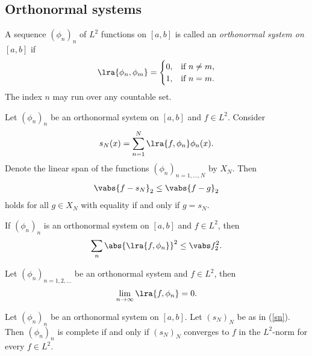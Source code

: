 \documentclass{article}
\begin{document}
\subsection{Orthonormal systems}

\begin{definition}[Notes 5.4]
    A sequence $(\phi_n)_n$ of $L^2$ functions on $[a,b]$ is called an \emph{orthonormal system on $[a,b]$}
    if
    \begin{align*}
        \lra{\phi_n, \phi_m} = \begin{cases}
            0, & \text{if }n\not=m, \\
            1, & \text{if }n=m.
        \end{cases}
    \end{align*}
    The index $n$ may run over any countable set.
\end{definition}

\begin{theorem}[Notes 5.2]
    Let $(\phi_n)_n$ be an orthonormal system on $[a,b]$ and $f\in L^2$. Consider
    \begin{align}
        \label{sn}
        s_N(x) = \sum_{n=1}^N \lra{f,\phi_n}\phi_n(x).
    \end{align}
    Denote the linear span of the functions $(\phi_n)_{n=1,...,N}$ by $X_N$. Then
    \begin{align*}
        \vabs{f-s_N}_2 \leq \vabs{f-g}_2
    \end{align*}
    holds for all $g\in X_N$ with equality if and only if $g=s_N$.
\end{theorem}

\begin{theorem}
    If $(\phi_n)_n$ is an orthonormal system on $[a,b]$ and $f\in L^2$, then
    \begin{align*}
        \sum_n \abs{\lra{f,\phi_n}}^2 \leq \vabs f_2^2.
    \end{align*}
\end{theorem}

\begin{corollary}
    Let $(\phi_n)_{n=1,2,...}$ be an orthonormal system and $f\in L^2$, then
    \begin{align*}
        \lim_{n\to\infty} \lra{f,\phi_n}=0.
    \end{align*}
\end{corollary}

\begin{theorem}[Notes 5.4]
    Let $(\phi_n)_n$ be an orthonormal system on $[a,b]$. Let $(s_N)_N$ be as in (\ref{sn}).
    Then $(\phi_n)_n$ is complete if and only if $(s_N)_N$ converges to $f$ in the $L^2$-norm
    for every $f\in L^2$.
\end{theorem}
\end{document}
